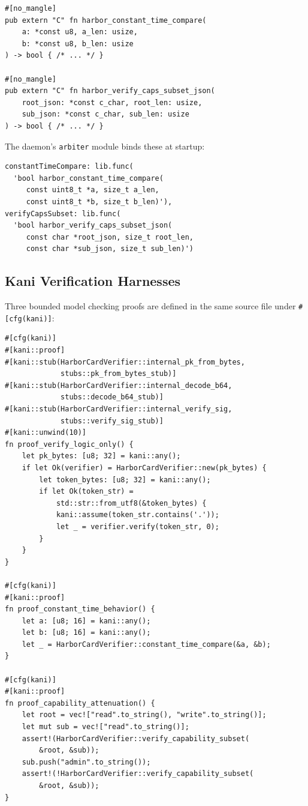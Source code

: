\documentclass[11pt,a4paper]{article}
\theoremstyle{definition}
\begin{document}
\begin{lstlisting}[style=rust, caption={FFI Exports — Called from the daemon's Arbiter module}]
#[no_mangle]
pub extern "C" fn harbor_constant_time_compare(
    a: *const u8, a_len: usize,
    b: *const u8, b_len: usize
) -> bool { /* ... */ }

#[no_mangle]
pub extern "C" fn harbor_verify_caps_subset_json(
    root_json: *const c_char, root_len: usize,
    sub_json: *const c_char, sub_len: usize
) -> bool { /* ... */ }
\end{lstlisting}

The daemon's \texttt{arbiter} module binds these at startup:

\begin{lstlisting}[caption={TypeScript FFI Binding (daemon-side Arbiter)}]
constantTimeCompare: lib.func(
  'bool harbor_constant_time_compare(
     const uint8_t *a, size_t a_len,
     const uint8_t *b, size_t b_len)'),
verifyCapsSubset: lib.func(
  'bool harbor_verify_caps_subset_json(
     const char *root_json, size_t root_len,
     const char *sub_json, size_t sub_len)')
\end{lstlisting}

\subsection{Kani Verification Harnesses}

Three bounded model checking proofs are defined in the same source file under \texttt{\#[cfg(kani)]}:

\begin{lstlisting}[style=rust, caption={Kani Proof Harnesses (Deployed Source)}]
#[cfg(kani)]
#[kani::proof]
#[kani::stub(HarborCardVerifier::internal_pk_from_bytes,
             stubs::pk_from_bytes_stub)]
#[kani::stub(HarborCardVerifier::internal_decode_b64,
             stubs::decode_b64_stub)]
#[kani::stub(HarborCardVerifier::internal_verify_sig,
             stubs::verify_sig_stub)]
#[kani::unwind(10)]
fn proof_verify_logic_only() {
    let pk_bytes: [u8; 32] = kani::any();
    if let Ok(verifier) = HarborCardVerifier::new(pk_bytes) {
        let token_bytes: [u8; 32] = kani::any();
        if let Ok(token_str) =
            std::str::from_utf8(&token_bytes) {
            kani::assume(token_str.contains('.'));
            let _ = verifier.verify(token_str, 0);
        }
    }
}

#[cfg(kani)]
#[kani::proof]
fn proof_constant_time_behavior() {
    let a: [u8; 16] = kani::any();
    let b: [u8; 16] = kani::any();
    let _ = HarborCardVerifier::constant_time_compare(&a, &b);
}

#[cfg(kani)]
#[kani::proof]
fn proof_capability_attenuation() {
    let root = vec!["read".to_string(), "write".to_string()];
    let mut sub = vec!["read".to_string()];
    assert!(HarborCardVerifier::verify_capability_subset(
        &root, &sub));
    sub.push("admin".to_string());
    assert!(!HarborCardVerifier::verify_capability_subset(
        &root, &sub));
}
\end{lstlisting}
\end{document}
